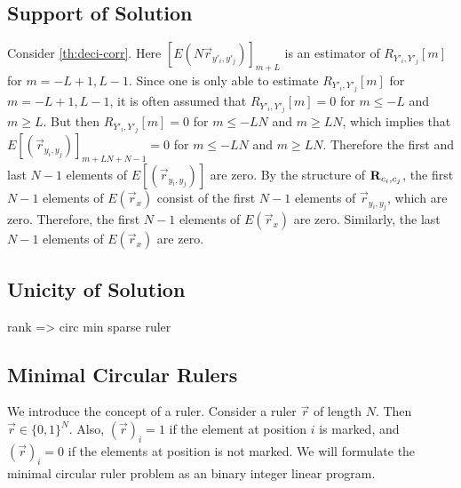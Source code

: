 \documentclass[a4paper, openany, oneside]{memoir}
\begin{document}
\subsection{Support of Solution}
Consider \cref{th:deci-corr}. Here $[E(N \vec{r}_{y'_i,y'_j})]_{m + L}$ is an estimator of $R_{Y'_i,Y'_j}[m]$ for $m = -L+1,L-1$. Since one is only able to estimate $R_{Y'_i,Y'_j}[m]$ for $m=-L+1,L-1$, it is often assumed that $R_{Y'_i,Y'_j}[m]=0$ for $m \le -L$ and $m \ge L$. But then $R_{Y'_i,Y'_j}[m]=0$ for $m \le -LN$ and $m \ge LN$, which implies that $E[(\vec{r}_{y_i,y_j})]_{m+LN + N-1}=0$ for $m \le -LN$ and $m \ge LN$. Therefore the first and last $N-1$ elements of $E[(\vec{r}_{y_i,y_j})]$ are zero. By the structure of $\boldsymbol{\mathbf{R}}_{c_i,c_j}$, the first $N-1$ elements of $E(\vec{r}_x)$ consist of the first $N-1$ elements of $\vec{r}_{y_i,y_j}$, which are zero. Therefore, the first $N-1$ elements of $E(\vec{r}_x)$ are zero. Similarly, the last $N-1$ elements of $E(\vec{r}_x)$ are zero.

\subsection{Unicity of Solution}
rank => circ min sparse ruler

\subsection{Minimal Circular Rulers}
We introduce the concept of a ruler. Consider a ruler $\vec{r}$ of length $N$. Then $\vec{r} \in \{0,1\}^N$. Also, $(\vec{r})_i = 1$ if the element at position $i$ is marked, and $(\vec{r})_i = 0$ if the elements at position is not marked. We will formulate the minimal circular ruler problem as an binary integer linear program.
\end{document}
